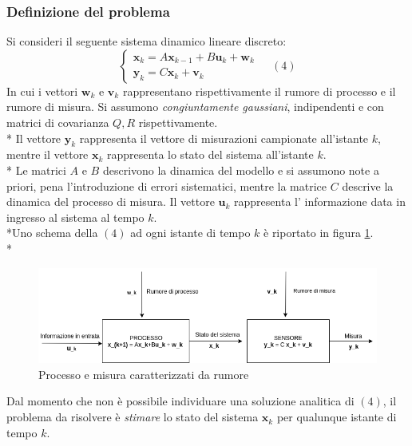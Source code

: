 \subsubsection{Definizione del problema}
Si consideri il seguente sistema dinamico lineare discreto:
$$
\begin{cases}
\mathbf x_k = A \mathbf x_{k-1} + B \mathbf u_k + \mathbf w_k \\
\mathbf y_k = C \mathbf x_k + \mathbf v_k
\end{cases}\;\;\;\;(4)
$$
In cui i vettori $\mathbf w_k$ e $\mathbf v_k$ rappresentano rispettivamente il rumore di processo e il rumore di misura. Si assumono \emph{congiuntamente gaussiani}, indipendenti e con matrici di covarianza $Q,R$ rispettivamente.\\*
Il vettore $\mathbf y_k$ rappresenta il vettore di misurazioni campionate all'istante $k$, mentre il vettore $\mathbf x_k$ rappresenta lo stato del sistema all'istante $k$.\\*
Le matrici $A$ e $B$ descrivono la dinamica del modello e si assumono note a priori, pena l'introduzione di errori sistematici, mentre la matrice $C$ descrive la dinamica del processo di misura. Il vettore $\mathbf u_k$ rappresenta l' informazione data in ingresso al sistema al tempo $k$.\\*Uno schema della $(4)$ ad ogni istante di tempo $k$ \`e riportato in figura \ref{fig:mimo2}.\\*
\begin{figure}[t]
	\centering
	\includegraphics[width=\linewidth]{img/mimo2}
	\caption{Processo e misura caratterizzati da rumore}
	\label{fig:mimo2}
\end{figure}
Dal momento che non \`e possibile individuare una soluzione analitica di $(4)$, il problema da risolvere \`e \emph{stimare} lo stato del sistema $\mathbf{x}_k$ per qualunque istante di tempo $k$.
